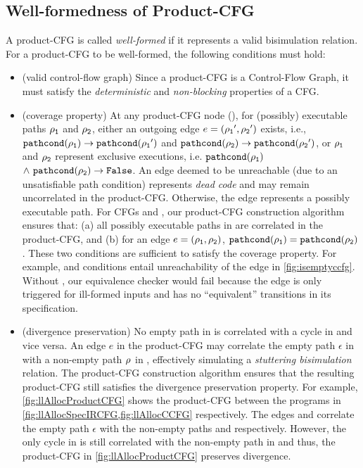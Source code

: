 \subsection{Well-formedness of Product-CFG}
\label{sec:wellformedproductcfg}
A product-CFG is called {\em well-formed} if it represents a valid bisimulation relation. For a product-CFG to be well-formed,
the following conditions must hold:
\begin{itemize}
\item[] (valid control-flow graph) Since a product-CFG is a Control-Flow Graph,
it must satisfy the {\em deterministic} and {\em non-blocking} properties of a CFG.

\item[] (coverage property) At any product-CFG node (), for (possibly) executable paths ${\tt \rho_{1}}$ and ${\tt \rho_{2}}$,
either an outgoing edge $e=({\tt \rho_{1}}',{\tt \rho_{2}}')$ exists, i.e., ${{\tt pathcond}({\tt \rho_{1}})} \rightarrow {\ensuremath{{\tt pathcond}({\tt \rho_{1}}')}}$
and ${{\tt pathcond}({\tt \rho_{2}})} \rightarrow {\ensuremath{{\tt pathcond}({\tt \rho_{2}}')}}$, or ${\tt \rho_{1}}$ and ${\tt \rho_{2}}$ represent exclusive
executions, i.e. ${{\tt pathcond}({\tt \rho_{1}})}$ $\land \ {{\tt pathcond}({\tt \rho_{2}})} \rightarrow {\tt False}$.
An edge deemed to be unreachable (due to an unsatisfiable path condition) represents {\em dead code} and may remain uncorrelated
in the product-CFG. Otherwise, the edge represents a possibly executable path.
For CFGs \sprog{} and \cprog{}, our product-CFG construction algorithm ensures that: (a) all possibly executable paths in \cprog{}
are correlated in the product-CFG, and (b) for an edge $e = ({\tt \rho_{1}}, {\tt \rho_{2}})$, ${{\tt pathcond}({\tt \rho_{1}})} = {{\tt pathcond}({\tt \rho_{2}})}$.
These two conditions are sufficient to satisfy the coverage property.
For example, \sdef{} and \pre{} conditions entail unreachability of the edge  in \cref{fig:isemptyccfg}.
Without \sdef{}, our equivalence checker would fail because the edge  is only triggered for ill-formed
inputs and has no ``equivalent'' transitions in its specification.

\item[] (divergence preservation) No empty path in \sprog{} is correlated with a cycle in \cprog{} and vice versa.
An edge $e$ in the product-CFG may correlate the empty path $\epsilon$ in \sprog{} with a non-empty path ${\tt \rho_{}}$ in \cprog{},
effectively simulating a {\em stuttering bisimulation} relation.
The product-CFG construction algorithm ensures that the resulting product-CFG still satisfies the divergence preservation property.
For example, \cref{fig:llAllocProductCFG} shows the product-CFG between the programs in \cref{fig:llAllocSpecIRCFG,fig:llAllocCCFG} respectively.
The edges  and  correlate the empty path $\epsilon$ with the non-empty paths  and 
respectively.
However, the only cycle  in \cprog{} is still correlated with the non-empty path  in \sprog{}
and thus, the product-CFG in \cref{fig:llAllocProductCFG} preserves divergence.


\end{itemize}
